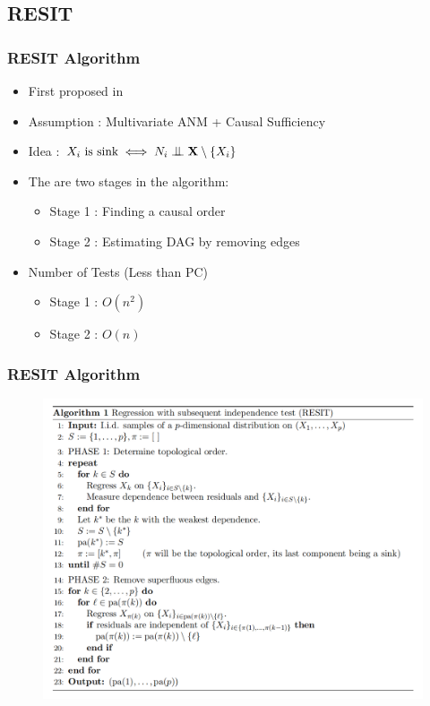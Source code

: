 \documentclass{beamer}
\newcommand{\bigCI}{\mathrel{\text{\scalebox{1.07}{$\perp\mkern-10mu\perp$}}}}
\begin{document}
\subsection{RESIT}
\begin{frame}
\frametitle{RESIT Algorithm}
\begin{itemize}
	\item First proposed in \cite{continous}
	\item Assumption : Multivariate ANM + Causal Sufficiency 
	 \item Idea :  $X_i \textrm{ is sink} \iff N_i \bigCI \mathbf{X} \setminus \{X_i\}$ 
	\item The are two stages in the algorithm:
		\begin{itemize}
			\item Stage 1 : Finding a causal order 
			\item Stage 2 : Estimating DAG by removing edges
		\end{itemize}
	\item Number of Tests (Less than PC)
		\begin{itemize}
			\item Stage 1 : $O(n^2)$			
			\item Stage 2 : $O(n)$
		\end{itemize}
\end{itemize}
\end{frame}

\begin{frame}
\frametitle{RESIT Algorithm}
\begin{figure}
	\includegraphics[scale=0.2]{alg.png}
\end{figure}
\end{frame}
\end{document}
